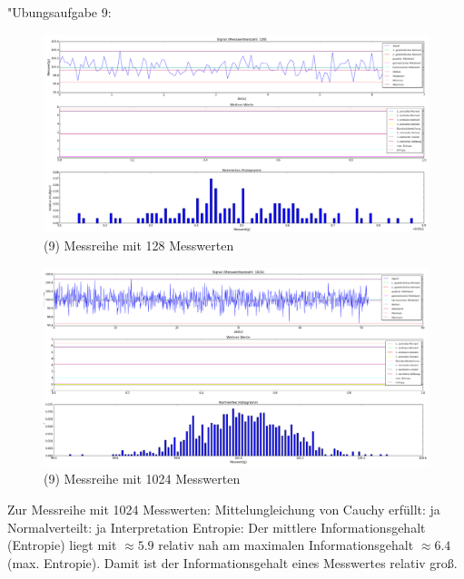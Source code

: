 \documentclass[fleqn,a4paper,12pt]{article}
\begin{document}
  \newpage
  "Ubungsaufgabe 9: \newline
  \begin{figure}
      \includegraphics[width=1.0\textwidth]{a9_128.png}
      \caption{(9) Messreihe mit 128 Messwerten}
  \end{figure}
  \begin{figure}
    \includegraphics[width=1.0\textwidth]{a9_1024.png}
    \caption{(9) Messreihe mit 1024 Messwerten}
  \end{figure}
  Zur Messreihe mit 1024 Messwerten: \newline
  Mittelungleichung von Cauchy erfüllt: ja \newline
  Normalverteilt: ja \newline
  Interpretation Entropie: Der mittlere Informationsgehalt (Entropie) liegt mit $\approx 5.9$ relativ nah am maximalen Informationsgehalt $\approx 6.4$ (max. Entropie).
  Damit ist der Informationsgehalt eines Messwertes relativ groß. \newpage
\end{document}
